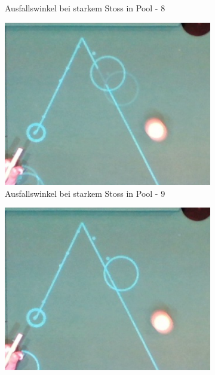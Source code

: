 \begin{figure}[h!]
\begin{subfigure}[b]{0.2\textwidth}
        \caption{Ausfallswinkel bei starkem Stoss in Pool - 8}
        \label{fig:rebound_angle_fast_pool_8}
    \end{subfigure}
    \hfill
    \begin{subfigure}[b]{0.2\textwidth}
        \centering
        \includegraphics[width=1.0\linewidth]{../common/04_results/resources/simulation/rebound_angle_fast_pool/00_rail_rebound_angle_fast_pool_09.png}
        \caption{Ausfallswinkel bei starkem Stoss in Pool - 9}
        \label{fig:rebound_angle_fast_pool_9}
    \end{subfigure}
    \hfill
    \begin{subfigure}[b]{0.2\textwidth}
        \centering
        \includegraphics[width=1.0\linewidth]{../common/04_results/resources/simulation/rebound_angle_fast_pool/00_rail_rebound_angle_fast_pool_10.png}

\end{subfigure}
\end{figure}
